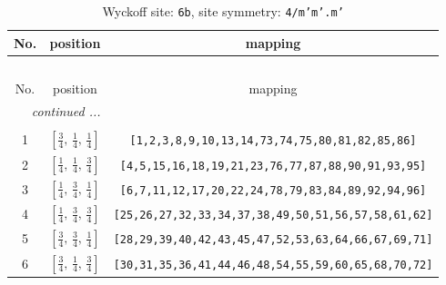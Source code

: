 \documentclass[fleqn,8pt]{jsarticle}
\begin{document}
\begin{longtable}{ccc}
\caption{Wyckoff site: {\tt 6b}, site symmetry: {\tt 4/m'm'.m'}}
 \\
 \hline \hline
No. & position & mapping \\ \hline \endfirsthead

\multicolumn{2}{l}{\tablename\ \thetable{}} \\
 \hline \hline
No. & position & mapping \\ \hline \endhead

 \hline \hline
\multicolumn{2}{r}{\footnotesize\it continued ...} \\ \endfoot

 \hline \hline
\multicolumn{2}{r}{} \\ \endlastfoot

1 & $\left[ \frac{3}{4},\, \frac{1}{4},\, \frac{1}{4} \right]$ & {\tt [1,2,3,8,9,10,13,14,73,74,75,80,81,82,85,86]} \\ \hline
2 & $\left[ \frac{1}{4},\, \frac{1}{4},\, \frac{3}{4} \right]$ & {\tt [4,5,15,16,18,19,21,23,76,77,87,88,90,91,93,95]} \\ \hline
3 & $\left[ \frac{1}{4},\, \frac{3}{4},\, \frac{1}{4} \right]$ & {\tt [6,7,11,12,17,20,22,24,78,79,83,84,89,92,94,96]} \\ \hline
4 & $\left[ \frac{1}{4},\, \frac{3}{4},\, \frac{3}{4} \right]$ & {\tt [25,26,27,32,33,34,37,38,49,50,51,56,57,58,61,62]} \\ \hline
5 & $\left[ \frac{3}{4},\, \frac{3}{4},\, \frac{1}{4} \right]$ & {\tt [28,29,39,40,42,43,45,47,52,53,63,64,66,67,69,71]} \\ \hline
6 & $\left[ \frac{3}{4},\, \frac{1}{4},\, \frac{3}{4} \right]$ & {\tt [30,31,35,36,41,44,46,48,54,55,59,60,65,68,70,72]} \\
\end{longtable}
\renewcommand{\arraystretch}{1.2}
\end{document}
